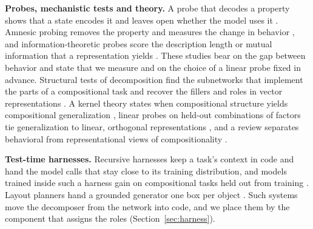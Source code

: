 \textbf{Probes, mechanistic tests and theory.} A probe that decodes a property shows that a state encodes it and leaves open whether the model uses it \citep{ravichander2021probing}. Amnesic probing removes the property and measures the change in behavior \citep{elazar2021amnesic}, and information-theoretic probes score the description length or mutual information that a representation yields \citep{voita2020mdl,pimentel2020infoprobing}. These studies bear on the gap between behavior and state that we measure and on the choice of a linear probe fixed in advance. Structural tests of decomposition find the subnetworks that implement the parts of a compositional task \citep{lepori2023} and recover the fillers and roles in vector representations \citep{soulos2020}. A kernel theory states when compositional structure yields compositional generalization \citep{lippl2025}, linear probes on held-out combinations of factors tie generalization to linear, orthogonal representations \citep{uselis2026}, and a review separates behavioral from representational views of compositionality \citep{russin2024}.

\textbf{Test-time harnesses.} Recursive harnesses keep a task's context in code and hand the model calls that stay close to its training distribution, and models trained inside such a harness gain on compositional tasks held out from training \citep{zhang2025rlm,zhang2026harness}. Layout planners hand a grounded generator one box per object \citep{lian2024llmgrounded,li2023gligen}. Such systems move the decomposer from the network into code, and we place them by the component that assigns the roles (Section~\ref{sec:harness}).

